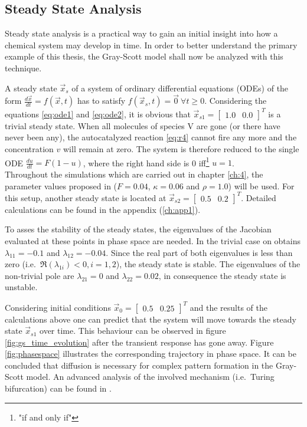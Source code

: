 \subsection{Steady State Analysis}
Steady state analysis is a practical way to gain an initial insight into how a chemical system may develop in time. In order to better understand the primary example of this thesis, the Gray-Scott model shall now be analyzed with this technique. 

A steady state $\vec{x}_s$ of a system of ordinary differential equations (ODEs) of the form $\frac{d\vec{x}}{dt}=f(\vec{x},t)$ has to satisfy $f(\vec{x}_s,t)=\vec{0} \ \forall t \geq 0$. Considering the equations \eqref{eq:ode1} and \eqref{eq:ode2}, it is obvious that $\vec{x}_{s1} = \begin{bmatrix} 1.0 & 0.0\end{bmatrix}^T$ is a trivial steady state. When all molecules of species V are gone (or there have never been any), the autocatalyzed reaction \eqref{eq:r4} cannot fire any more and the concentration $v$ will remain at zero. The system is therefore reduced to the single ODE $\frac{du}{dt} = F (1-u)$, where the right hand side is 0 iff\footnote{"if and only if"} $u=1$. \\
Throughout the simulations which are carried out in chapter \ref{ch:4}, the parameter values proposed in \cite{rossinelli_accelerated_2008} ($F = 0.04$, $\kappa = 0.06$ and $\rho = 1.0$) will be used. For this setup, another steady state is located at $\vec{x}_{s2} = \begin{bmatrix}0.5 & 0.2\end{bmatrix}^T$. Detailed calculations can be found in the appendix (\ref{ch:app1}). 

To asses the stability of the steady states, the eigenvalues of the Jacobian evaluated at these points in phase space are needed. In the trivial case on obtains $\lambda_{11} = -0.1$ and $\lambda_{12} = -0.04$. Since the real part of both eigenvalues is less than zero (i.e.\ $\Re(\lambda_{1i})<0, i=1,2$), the steady state is stable. The eigenvalues of the non-trivial pole are $\lambda_{21} = 0$ and $\lambda_{22} = 0.02$, in consequence the steady state is unstable. 

Considering initial conditions $\vec{x}_0 = \begin{bmatrix}0.5 & 0.25\end{bmatrix}^T$ and the results of the calculations above one can predict that the system will move towards the steady state $\vec{x}_{s1}$ over time. This behaviour can be observed in figure \ref{fig:gs_time_evolution} after the transient response has gone away. Figure \ref{fig:phasespace} illustrates the corresponding trajectory in phase space. It can be concluded that diffusion is necessary for complex pattern formation in the Gray-Scott model. An advanced analysis of the involved mechanism (i.e.\ Turing bifurcation) can be found in \cite{vastano_turing_1988}. 

